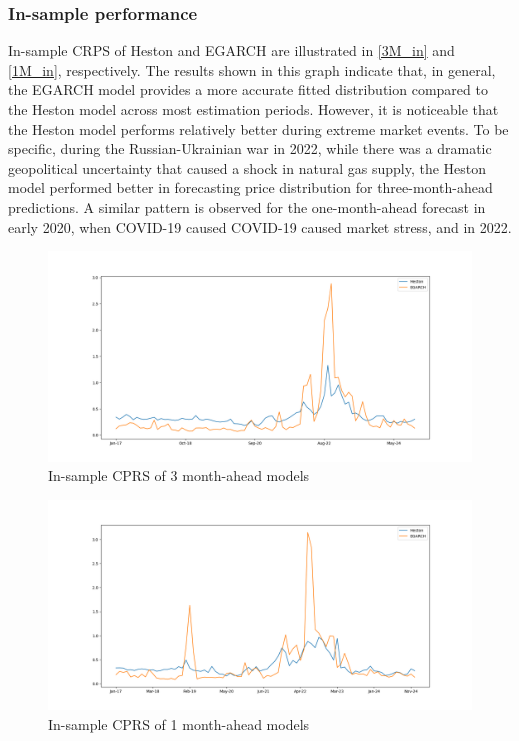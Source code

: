 \documentclass[12pt,a4paper]{article}
\newcommand\colorAutoref[1]{{\hypersetup{linkcolor=black}\autoref{#1}}}
\numberwithin{equation}{section}
\begin{document}
\subsubsection{In-sample performance}


In-sample CRPS of Heston and EGARCH are illustrated in \colorAutoref{3M_in} and \colorAutoref{1M_in}, respectively. The results shown in this graph indicate that, in general, the EGARCH model provides a more accurate fitted distribution compared to the Heston model across most estimation periods. However, it is noticeable that the Heston model performs relatively better during extreme market events. To be specific, during the Russian-Ukrainian war in 2022, while there was a dramatic geopolitical uncertainty that caused a shock in natural gas supply, the Heston model performed better in forecasting price distribution for three-month-ahead predictions. A similar pattern is observed for the one-month-ahead forecast in early 2020, when COVID-19 caused COVID-19 caused market stress, and in 2022.

\begin{figure}[h!] 
\includegraphics[scale=1,width=1\linewidth,height=0.3\textheight]{insample_crps_3m.png}
\caption{In-sample CPRS of 3 month-ahead models}
\label{3M_in}
\end{figure}

\begin{figure}[h!] 
\includegraphics[scale=1,width=1\linewidth,height=0.3\textheight]{insample_crps_1m.png}
\caption{In-sample CPRS of 1 month-ahead models}
\label{1M_in}
\end{figure}
\end{document}

